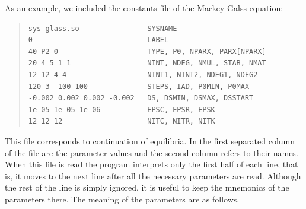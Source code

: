 \documentclass[10pt,a4paper]{ddedoc}
\begin{document}
As an example, we included the constants file of the Mackey-Galss equation:
{ \small \begin{quote} \begin{lstlisting}[basicstyle=\tt,frame=single]
sys-glass.so                SYSNAME
0                           LABEL
40 P2 0                     TYPE, P0, NPARX, PARX[NPARX]
20 4 5 1 1                  NINT, NDEG, NMUL, STAB, NMAT
12 12 4 4                   NINT1, NINT2, NDEG1, NDEG2
120 3 -100 100              STEPS, IAD, P0MIN, P0MAX
-0.002 0.002 0.002 -0.002   DS, DSMIN, DSMAX, DSSTART
1e-05 1e-05 1e-06           EPSC, EPSR, EPSK
12 12 12                    NITC, NITR, NITK
\end{lstlisting} \end{quote} } \noindent
This file corresponds to continuation of equilibria. In the first separated column 
of the file are the parameter values and the second column refers to their names. 
When this file is read the program interprets only the first half of each line,
that is, it moves to the next line after all the necessary parameters are read.
Although the rest of the line is simply ignored, 
it is useful to keep the mnemonics of the parameters there. The meaning of the
parameters are as follows.
\end{document}
